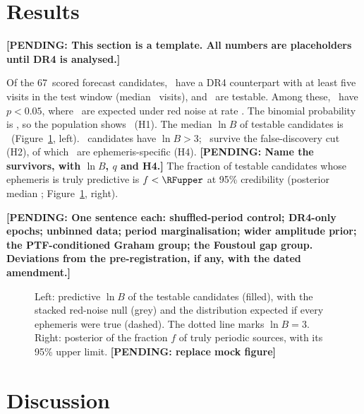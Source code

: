 \documentclass[RNAAS]{aastex631}
\newcommand{\Ncand}{67}            %
\newcommand{\pending}[1]{\textbf{[PENDING: #1]}}
\begin{document}
\section{Results}

\pending{This section is a template. All numbers are placeholders until DR4 is analysed.}

Of the \Ncand\ scored forecast candidates, \RNscored\ have a DR4 counterpart with at least five
visits in the test window (median \RMedianVisits\ visits), and \RNtest\ are testable. Among
these, \RHoneK\ have $p<0.05$, where \RHoneExpected\ are expected under red noise at rate
\RHoneRate. The binomial probability is \RHoneP, so the population shows \RHoneVerdict\ (H1). The
median $\ln B$ of testable candidates is \RMedianLnB\ (Figure~\ref{fig:lnb}, left).
\RNlnBthree\ candidates have $\ln B>3$; \RNsurv\ survive the false-discovery cut (H2), of which
\RNspecific\ are ephemeris-specific (H4). \pending{Name the survivors, with $\ln B$, $q$ and H4.}
The fraction of testable candidates whose ephemeris is truly predictive is $f<\RFupper$ at 95\%
credibility (posterior median \RFmedian; Figure~\ref{fig:lnb}, right).

\pending{One sentence each: shuffled-period control; DR4-only epochs; unbinned data; period
marginalisation; wider amplitude prior; the PTF-conditioned Graham group; the Foustoul gap group.
Deviations from the pre-registration, if any, with the dated amendment.}

\begin{figure}
\caption{Left: predictive $\ln B$ of the testable candidates (filled), with the stacked
red-noise null (grey) and the distribution expected if every ephemeris were true (dashed). The
dotted line marks $\ln B=3$. Right: posterior of the fraction $f$ of truly periodic sources, with
its 95\% upper limit. \pending{replace mock figure}\label{fig:lnb}}
\end{figure}

\section{Discussion}
\end{document}
